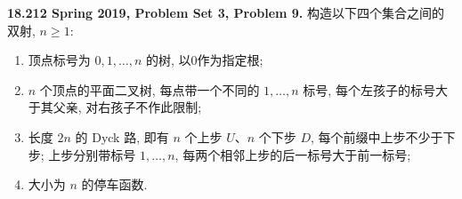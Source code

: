 \begin{exercise}\label{mit:18212-pset3-q9}
\textbf{18.212 Spring 2019, Problem Set 3, Problem 9.}
构造以下四个集合之间的双射, $n\ge1$:
\begin{enumerate}[label=(\arabic*)]
\item 顶点标号为 $0,1,\ldots,n$ 的树, 以0作为指定根;
\item $n$ 个顶点的平面二叉树, 每点带一个不同的 $1,\ldots,n$ 标号, 每个左孩子的标号大于其父亲, 对右孩子不作此限制;
\item 长度 $2n$ 的 Dyck 路, 即有 $n$ 个上步 $U$、$n$ 个下步 $D$, 每个前缀中上步不少于下步; 上步分别带标号 $1,\ldots,n$, 每两个相邻上步的后一标号大于前一标号;
\item 大小为 $n$ 的停车函数.
\end{enumerate}
\end{exercise}
